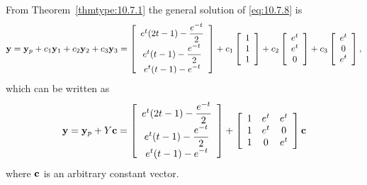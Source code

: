 \begin{examplesolution}
 From Theorem~\ref{thmtype:10.7.1} the general solution of \eqref{eq:10.7.8} is
\[
  {\bf y}={\bf y}_{p}+c_{1}{\bf y}_{1}+c_{2}{\bf y}_{2}+c_{3}{\bf y}_{3}= \left[
  \begin{array}{c}
    e^{t}(2t-1)-\displaystyle\frac{e^{-t}}{2} \\[5pt]
    e^{t}(t-1)-\displaystyle\frac{e^{-t}}{2}  \\[5pt]
    e^{t}(t-1)-\displaystyle{e^{-t}}
  \end{array}\right]+ c_{1}\left[
  \begin{array}{c}
    1 \\
    1 \\
    1
  \end{array}\right]+ c_{2}\left[
  \begin{array}{c}
    e^{t} \\
    e^{t} \\
    0
  \end{array}\right] +c_{3}\left[
  \begin{array}{c}
    e^{t} \\
    0     \\
    e^{t}
  \end{array}\right],
\]
which can be written as
\[
  {\bf y}={\bf y}_{p}+Y{\bf c}= \left[
  \begin{array}{c}
    e^{t}(2t-1)-\displaystyle\frac{e^{-t}}{2} \\[5pt]
    e^{t}(t-1)-\displaystyle\frac{e^{-t}}{2}  \\[5pt]
    e^{t}(t-1)-\displaystyle{e^{-t}}
  \end{array}\right]+ \left[
  \begin{array}{ccc}
    1 & e^{t} & e^{t} \\
    1 & e^{t} & 0     \\
    1 & 0     & e^{t}
  \end{array}\right]{\bf c}
\]
where ${\bf c}$ is an arbitrary constant vector.
\end{examplesolution}

